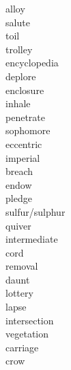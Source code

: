 \documentclass[a4paper, 11pt]{ctexart}
\begin{document}
\begin{multicols*}{3}
\begin{description}
\item[alloy]

\item[salute]

\item[toil]

\item[trolley]

\item[encyclopedia]

\item[deplore]

\item[enclosure]

\item[inhale]

\item[penetrate]

\item[sophomore]

\item[eccentric]

\item[imperial]

\item[breach]

\item[endow]

\item[pledge]

\item[sulfur/sulphur]

\item[quiver]

\item[intermediate]

\item[cord]

\item[removal]

\item[daunt]

\item[lottery]

\item[lapse]

\item[intersection]

\item[vegetation]

\item[carriage]

\item[crow]


\end{description}
\end{multicols*}
\end{document}
